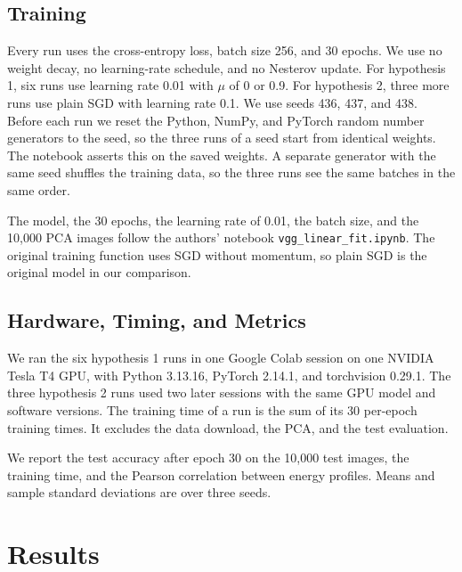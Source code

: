 \documentclass[conference]{IEEEtran}
\begin{document}
\subsection{Training}
Every run uses the cross-entropy loss, batch size 256, and 30 epochs. We use
no weight decay, no learning-rate schedule, and no Nesterov update. For
hypothesis 1, six runs use learning rate 0.01 with $\mu$ of 0 or 0.9. For
hypothesis 2, three more runs use plain SGD with learning rate 0.1. We use
seeds 436, 437, and 438. Before each run we reset the Python, NumPy, and
PyTorch random number generators to the seed, so the three runs of a seed
start from identical weights. The notebook asserts this on the saved weights.
A separate generator with the same seed shuffles the training data, so the
three runs see the same batches in the same order.

The model, the 30 epochs, the learning rate of 0.01, the batch size, and the
10,000 PCA images follow the authors' notebook
\texttt{vgg\_linear\_fit.ipynb}. The
original training function uses SGD without momentum, so plain SGD is the
original model in our comparison.

\subsection{Hardware, Timing, and Metrics}
We ran the six hypothesis 1 runs in one Google Colab session on one NVIDIA
Tesla T4 GPU, with Python 3.13.16, PyTorch 2.14.1, and torchvision 0.29.1. The
three hypothesis 2 runs used two later sessions with the same GPU model and
software versions. The training time of a run is the sum of its 30 per-epoch
training times. It excludes the data download, the PCA, and the test
evaluation.

We report the test accuracy after epoch 30 on the 10,000 test images, the
training time, and the Pearson correlation between energy profiles. Means and
sample standard deviations are over three seeds.

\section{Results}
\end{document}
